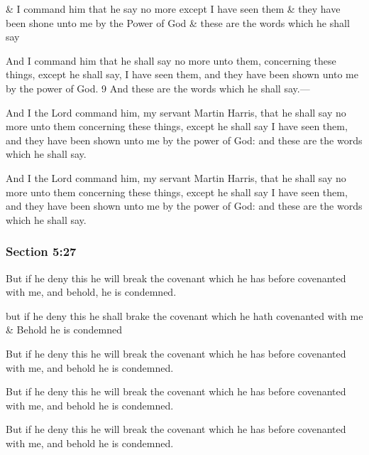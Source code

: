 		\begin{framed}
		\scriptsize
			\begin{compactdesc}
				\item[JSP] \& I command him that he say no more except I have seen them \& they have been shone unto me by the Power of God \& these are the words which he shall say
				\item[RB1] [\textit{missing}]
				\item[BC] And I command him that he shall say no more unto them, concerning these things, except he shall say, I have seen them, and they have been shown unto me by the power of God. 9 And these are the words which he shall say.---
				\item[DC 1835] And I the Lord command him, my servant Martin Harris, that he shall say no more unto them concerning these things, except he shall say I have seen them, and they have been shown unto me by the power of God: and these are the words which he shall say.
				\item[DC 1844] And I the Lord command him, my servant Martin Harris, that he shall say no more unto them concerning these things, except he shall say I have seen them, and they have been shown unto me by the power of God: and these are the words which he shall say.
			\end{compactdesc}
		\end{framed}

	\subsubsection{Section 5:27} %
		\label{DC5-27}

		But if he deny this he will break the covenant which he has before covenanted with me, and behold, he is condemned.

		\begin{framed}
		\scriptsize
			\begin{compactdesc}
				\item[JSP] but if he deny this he shall brake the covenant which he hath covenanted with me \& Behold he is condemned
				\item[RB1] [\textit{missing}]
				\item[BC] But if he deny this he will break the covenant which he has before covenanted with me, and behold he is condemned.
				\item[DC 1835] But if he deny this he will break the covenant which he has before covenanted with me, and behold he is condemned.
				\item[DC 1844] But if he deny this he will break the covenant which he has before covenanted with me, and behold he is condemned.
			\end{compactdesc}
		\end{framed}

